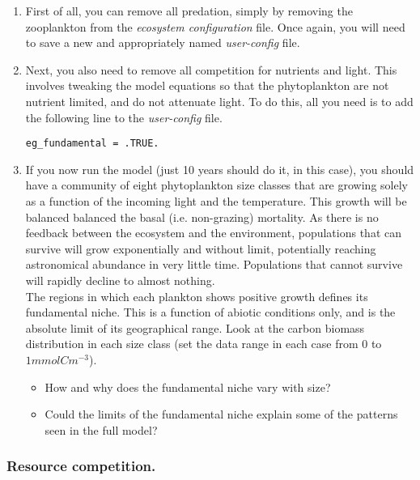 \documentclass[11pt,fleqn]{book} %
\begin{document}
\begin{enumerate}[noitemsep]
\vspace{1mm}
\item First of all, you can remove all predation, simply by removing the zooplankton from the \textit{ecosystem configuration} file. Once again, you will need to save a new and appropriately named \textit{user-config} file.
\vspace{1mm}
\item Next, you also need to remove all competition for nutrients and light. This involves tweaking the model equations so that the phytoplankton are not nutrient limited, and do not attenuate light. To do this, all you need is to add the following line to the \textit{user-config} file.
\small\begin{verbatim}
eg_fundamental = .TRUE.
\end{verbatim}\normalsize
\vspace{1mm}
\item If you now run the model (just 10 years should do it, in this case), you should have a community of eight phytoplankton size classes that are growing solely as a function of the incoming light and the temperature. This growth will be balanced balanced the basal (i.e. non-grazing) mortality. As there is no feedback between the ecosystem and the environment, populations that can survive will grow exponentially and without limit, potentially reaching astronomical abundance in very little time. Populations that cannot survive will rapidly decline to almost nothing.
\\The regions in which each plankton shows positive growth defines its fundamental niche. This is a function of abiotic conditions only, and is the absolute limit of its geographical range. Look at the carbon biomass distribution in each size class (set the data range in each case from \(0\) to \(1mmolCm^{-3}\)).
\begin{itemize}
\item How and why does the fundamental niche vary with size?
\item Could the limits of the fundamental niche explain some of the patterns seen in the full model?
\end{itemize}

\end{enumerate}
\vspace{2mm}


\subsubsection*{Resource competition.} 
\end{document}
